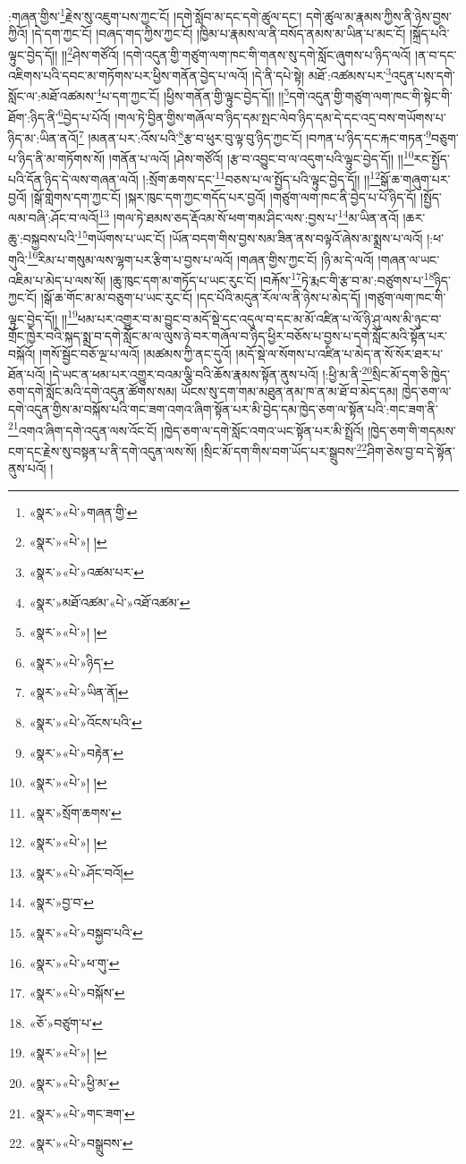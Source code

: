 :གཞན་གྱིས་\footnote{«སྣར་»«པེ་»གཞན་གྱི་}རྗེས་སུ་འཇུག་པས་ཀྱང་ངོ། །དགེ་སློབ་མ་དང་དགེ་ཚུལ་དང་། དགེ་ཚུལ་མ་རྣམས་ཀྱིས་ནི་ཉེས་བྱས་ཀྱིའོ། །དེ་དག་ཀྱང་ངོ། །བཞད་གད་ཀྱིས་ཀྱང་ངོ། །ཁྱིམ་པ་རྣམས་ལ་ནི་བསོད་ནམས་མ་ཡིན་པ་མང་ངོ། །སྐྲོད་པའི་ལྟུང་བྱེད་དོ།། །།\footnote{«སྣར་»«པེ་»། །}ཤེས་གཙོའོ། །དགེ་འདུན་གྱི་གཙུག་ལག་ཁང་གི་གནས་སུ་དགེ་སློང་ཞུགས་པ་ཉིད་ལའོ། །ན་བ་དང་འཇིགས་པའི་དབང་མ་གཏོགས་པར་ཕྱིས་གནོན་བྱེད་པ་ལའོ། །དེ་ནི་དཔེ་སྟེ། མཐོ་:འཚམས་པར་\footnote{«སྣར་»«པེ་»འཚམ་པར་}འདུན་པས་དགེ་སློང་ལ་:མཐོ་འཚམས་\footnote{«སྣར་»མཐོ་འཚམ་«པེ་»འཐོ་འཚམ་}པ་དག་ཀྱང་ངོ། །ཕྱིས་གནོན་གྱི་ལྟུང་བྱེད་དོ།། །།\footnote{«སྣར་»«པེ་»། །}དགེ་འདུན་གྱི་གཙུག་ལག་ཁང་གི་སྟེང་གི་ཐོག་:ཉིད་ནི་\footnote{«སྣར་»«པེ་»ཉིད་}བྱེད་པ་པོའོ། །གལ་ཏེ་བྱིན་གྱིས་གཞོལ་བ་ཉིད་དམ་སྤང་ལེབ་ཉིད་དམ་དེ་དང་འདྲ་བས་གཡོགས་པ་ཉིད་མ་:ཡིན་ནའོ།\footnote{«སྣར་»«པེ་»ཡིན་ནོ།} །མནན་པར་:འོས་པའི་\footnote{«སྣར་»«པེ་»འོངས་པའི་}རྩ་བ་ཕུར་བུ་ལྟ་བུ་ཉིད་ཀྱང་ངོ། །བཀན་པ་ཉིད་དང་རྐང་གཏན་\footnote{«སྣར་»«པེ་»བརྟེན་}བཅུག་པ་ཉིད་ནི་མ་གཏོགས་སོ། །གནོན་པ་ལའོ། །ཤེས་གཙོའོ། །རྩ་བ་འབྱུང་བ་ལ་འདུག་པའི་ལྟུང་བྱེད་དོ།། །།\footnote{«སྣར་»«པེ་»། །}རང་སྤྱོད་པའི་དོན་ཉིད་དེ་ལས་གཞན་ལའོ། །:སྲོག་ཆགས་དང་\footnote{«སྣར་»སྲོག་ཆགས་}བཅས་པ་ལ་སྤྱོད་པའི་ལྟུང་བྱེད་དོ།། །།\footnote{«སྣར་»«པེ་»། །}སྒོ་ཆ་གཞུག་པར་བྱའོ། །སྒོ་གླེགས་དག་ཀྱང་ངོ། །སྐར་ཁུང་དག་ཀྱང་གདོད་པར་བྱའོ། །གཙུག་ལག་ཁང་ནི་བྱེད་པ་པོ་ཉིད་དོ། །སྤྱོད་ལམ་བཞི་:ཤོང་བ་ལའོ།\footnote{«སྣར་»«པེ་»ཤོང་བའོ།} །གལ་ཏེ་ཐམས་ཅད་རྡོའམ་སོ་ཕག་གམ་ཤིང་ལས་:བྱས་པ་\footnote{«སྣར་»བྱ་བ་}མ་ཡིན་ནའོ། །ཆར་ཆུ་:བསྐྱབས་པའི་\footnote{«སྣར་»«པེ་»བསྐྱབ་པའི་}གཡོགས་པ་ཡང་ངོ། །ཡོན་བདག་གིས་བྱས་སམ་ཟིན་ནས་བལྟའོ་ཞེས་མ་སྨྲས་པ་ལའོ། །:ཕ་གུའི་\footnote{«སྣར་»«པེ་»ཕ་གུ་}རིམ་པ་གསུམ་ལས་ལྷག་པར་རྩིག་པ་བྱས་པ་ལའོ། །གཞན་གྱིས་ཀྱང་ངོ། །ཉི་མ་དེ་ལའོ། །གཞན་ལ་ཡང་འཇིམ་པ་མེད་པ་ལས་སོ། །ཆུ་ཁུང་དག་མ་གཏོད་པ་ཡང་རུང་ངོ། །བརྐོས་\footnote{«སྣར་»«པེ་»བསྐོས་}ཏེ་རྨང་གི་རྩ་བ་མ་:བཙུགས་པ་\footnote{«ཅོ་»བཙུག་པ་}ཉིད་ཀྱང་ངོ། །སྒོ་ཆ་གོང་མ་མ་བཅུག་པ་ཡང་རུང་ངོ། །དང་པོའི་མདུན་རོལ་ལ་ནི་ཉེས་པ་མེད་དོ། །གཙུག་ལག་ཁང་གི་ལྟུང་བྱེད་དོ།། །།\footnote{«སྣར་»«པེ་»། །}ཕམ་པར་འགྱུར་བ་མ་བྱུང་བ་མདོ་སྡེ་དང་འདུལ་བ་དང་མ་མོ་འཛིན་པ་ལོ་ཉི་ཤུ་ལས་མི་ཉུང་བ་གྲོང་ཁྱེར་བའི་སྐད་སྨྲ་བ་དགེ་སློང་མ་ལ་ལུས་ཉེ་བར་གཞོལ་བ་ཉིད་ཕྱིར་བཅོས་པ་བྱས་པ་དགེ་སློང་མའི་སྟོན་པར་བསྐོའོ། །གསོ་སྦྱོང་བཅོ་ལྔ་པ་ལའོ། །མཚམས་ཀྱི་ནང་དུའོ། །མདོ་སྡེ་ལ་སོགས་པ་འཛིན་པ་མེད་ན་སོ་སོར་ཐར་པ་ཐོན་པའོ། །དེ་ཡང་ན་ཕམ་པར་འགྱུར་བའམ་ལྕི་བའི་ཆོས་རྣམས་སྟོན་ནུས་པའོ། །:ཕྱི་མ་ནི་\footnote{«སྣར་»«པེ་»ཕྱི་མ་}སྲིང་མོ་དག་ཅི་ཁྱེད་ཅག་དགེ་སློང་མའི་དགེ་འདུན་ཚོགས་སམ། ཡོངས་སུ་དག་གམ་མཐུན་ནམ་ཁ་ན་མ་ཐོ་བ་མེད་དམ། ཁྱེད་ཅག་ལ་དགེ་འདུན་གྱིས་མ་བསྐོས་པའི་གང་ཟག་འགའ་ཞིག་སྟོན་པར་མི་བྱེད་དམ་ཁྱེད་ཅག་ལ་སྟོན་པའི་:གང་ཟག་ནི་\footnote{«སྣར་»«པེ་»གང་ཟག་}འགའ་ཞིག་དགེ་འདུན་ལས་འོང་ངོ། །ཁྱེད་ཅག་ལ་དགེ་སློང་འགའ་ཡང་སྟོན་པར་མི་སྤྲོའོ། །ཁྱེད་ཅག་གི་གདམས་ངག་དང་རྗེས་སུ་བསྟན་པ་ནི་དགེ་འདུན་ལས་སོ། །སྲིང་མོ་དག་གིས་བག་ཡོད་པར་སྒྲུབས་\footnote{«སྣར་»«པེ་»བསྒྲུབས་}ཤིག་ཅེས་བྱ་བ་དེ་སྟོན་ནུས་པའོ། །
